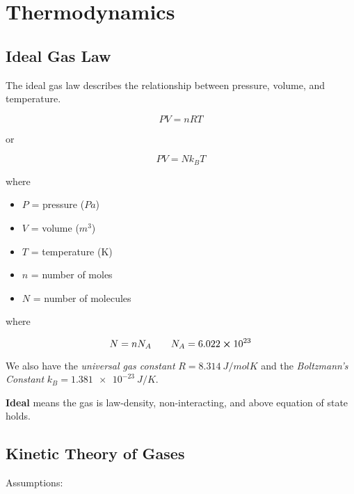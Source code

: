 \chapter{Thermodynamics}


\section{Ideal Gas Law}

\begin{definition}
	The ideal gas law describes the relationship between pressure, volume, and temperature.

	\begin{equation}
		PV=nRT
	\end{equation}

	or

	\begin{equation}
		PV = N k_B T
	\end{equation}

	where

	\begin{itemize}
		\item $P$ = pressure ($\si{Pa}$)
		\item $V$ = volume ($\si{m^3}$)
		\item $T$ = temperature (K)
		\item $n$ = number of moles
		\item $N$ = number of molecules
	\end{itemize}

	where

	\begin{equation}
		N = n N_A \qquad N_A = 6.022 \cross 10^{23}
	\end{equation}

	We also have the \textit{universal gas constant} $R = \SI{8.314}{J/mol K}$ and the \textit{Boltzmann's Constant} $k_B = \SI{1.381e-23}{J/K}$.

\end{definition}

\textbf{Ideal} means the gas is law-density, non-interacting, and above equation of state holds.

\section{Kinetic Theory of Gases}

Assumptions:


